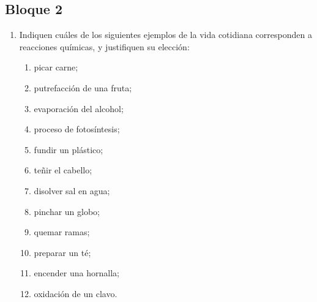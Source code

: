\documentclass[../practica.root.tex]{subfiles}
\begin{document}
\subsection{Bloque 2}
\begin{enumerate}
	\item Indiquen cuáles de los siguientes ejemplos de la vida cotidiana corresponden a reacciones
	      químicas, y justifiquen su elección:
	      \begin{enumerate}
		      \item picar carne;
		      \item putrefacción de una fruta; \checkmark
		      \item evaporación del alcohol;
		      \item proceso de fotosíntesis; \checkmark
		      \item fundir un plástico;
		      \item teñir el cabello; \checkmark %
		      \item disolver sal en agua; %
		      \item pinchar un globo;
		      \item quemar ramas; \checkmark
		      \item preparar un té;
		      \item encender una hornalla; \checkmark
		      \item oxidación de un clavo. \checkmark
	      \end{enumerate}


\end{enumerate}
\end{document}
